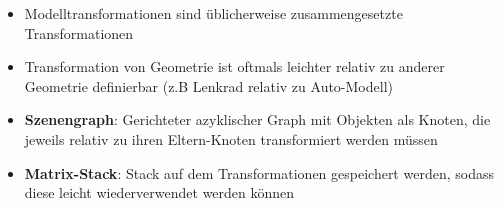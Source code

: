 \begin{itemize}
	\item Modelltransformationen sind üblicherweise zusammengesetzte Transformationen
	\item Transformation von Geometrie ist oftmals leichter relativ zu anderer Geometrie definierbar (z.B Lenkrad relativ zu Auto-Modell)
	\item \textbf{Szenengraph}: Gerichteter azyklischer Graph mit Objekten als Knoten, die jeweils relativ zu ihren Eltern-Knoten transformiert werden müssen
	\item \textbf{Matrix-Stack}: Stack auf dem Transformationen gespeichert werden, sodass diese leicht wiederverwendet werden können
\end{itemize}